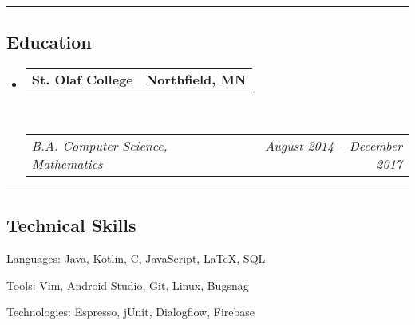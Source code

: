 \documentclass[9pt,letterpaper]{article}
\makeatletter
\newenvironment{indentsection}[1]%
{\begin{list}{}%
	{\setlength{\leftmargin}{#1}}%
	\item[]%
}
{\end{list}}
\newcommand{\headerrow}[2]
{\begin{tabular*}{\linewidth}{l@{\extracolsep{\fill}}r}
	#1 &
	#2 \\
\end{tabular*}}
\newcommand{\CPP}
{C\nolinebreak[4]\hspace{-.05em}\raisebox{.22ex}{\footnotesize\bf ++}}
\makeatother
\begin{document}
\begin{itemize}
\end{itemize}


\hrule
\vspace{-0.4em}
\subsection*{Education}

\begin{itemize}
	\parskip=0.1em

	\item
	\headerrow
		{\textbf{St. Olaf College}}
		{\textbf{Northfield, MN}}
	\\
	\headerrow
		{\emph{B.A. Computer Science, Mathematics}}
		{\emph{August 2014 -- December 2017}}

\end{itemize}


\hrule
\vspace{-0.4em}
\subsection*{Technical Skills}

\begin{indentsection}{\parindent}
\begin{description*}
	\item[Languages:]
	Java, Kotlin, \CPP, JavaScript, \LaTeX, SQL
	\item[Tools:]
	Vim, Android Studio, Git, Linux, Bugsnag
	\item[Technologies:]
	Espresso, jUnit, Dialogflow, Firebase
\end{description*}
\end{indentsection}
\end{document}
